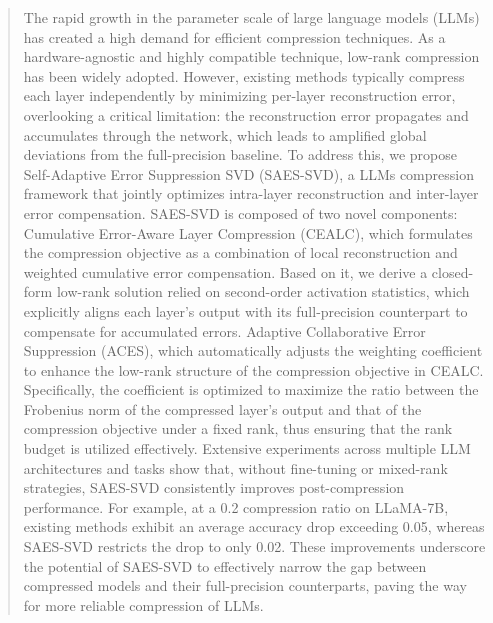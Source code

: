 \begin{abstract}
The rapid growth in the parameter scale of large language models (LLMs) has created a high demand for efficient compression techniques. 
As a hardware-agnostic and highly compatible technique, low-rank compression has been widely adopted. However, existing methods typically compress each layer independently by minimizing per-layer reconstruction error, overlooking a critical limitation: the reconstruction error propagates and accumulates through the network, which leads to amplified global deviations from the full-precision baseline.
To address this, we propose Self-Adaptive Error Suppression SVD (SAES-SVD), a LLMs compression framework that jointly optimizes intra-layer reconstruction and inter-layer error compensation.
SAES-SVD is composed of two novel components:
 Cumulative Error-Aware Layer Compression (CEALC), which formulates the compression objective as a combination of local reconstruction and weighted cumulative error compensation. Based on it, we derive a closed-form low-rank solution relied on second-order activation statistics, which explicitly aligns each layer's output with its full-precision counterpart to compensate for accumulated errors.
 Adaptive Collaborative Error Suppression (ACES), which automatically adjusts the weighting coefficient to enhance the low-rank structure of the compression objective in CEALC. Specifically, the coefficient is optimized to maximize the ratio between the Frobenius norm of the compressed layer's output and that of the compression objective under a fixed rank, thus ensuring that the rank budget is utilized effectively.
Extensive experiments across multiple LLM architectures and tasks show that, without fine-tuning or mixed-rank strategies, SAES-SVD consistently improves post-compression performance. 
For example, at a 0.2 compression ratio on LLaMA-7B, existing methods exhibit an average accuracy drop exceeding 0.05, whereas SAES-SVD restricts the drop to only 0.02. These improvements underscore the potential of SAES-SVD to effectively narrow the gap between compressed models and their full-precision counterparts, paving the way for more reliable compression of LLMs.
\end{abstract}